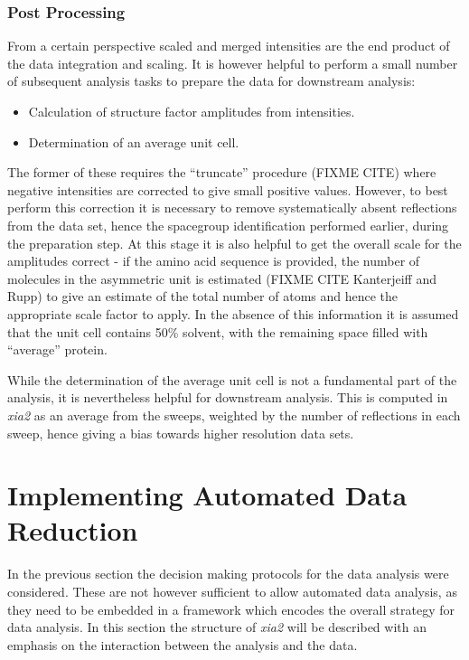 \documentclass[preprint,pdf]{iucr}
\begin{document}
\subsubsection{Post Processing}

From a certain perspective scaled and merged intensities are the end
product of the data integration and scaling. It is however helpful to
perform a small number of subsequent analysis tasks to prepare the
data for downstream analysis:

\begin{itemize}
\item{Calculation of structure factor amplitudes from intensities.}
\item{Determination of an average unit cell.}
\end{itemize}

\noindent
The former of these requires the ``truncate'' procedure (FIXME CITE)
where negative intensities are corrected to give small positive
values. However, to best perform this correction it is necessary to
remove systematically absent reflections from the data set, hence the
spacegroup identification performed earlier, during the preparation
step. At this stage it is also helpful to get the overall scale for
the amplitudes correct - if the amino acid sequence is provided, the
number of molecules in the asymmetric unit is estimated (FIXME CITE
Kanterjeiff and Rupp) to give an estimate of the total number of atoms
and hence the appropriate scale factor to apply. In the absence of
this information it is assumed that the unit cell contains 50\%
solvent, with the remaining space filled with ``average'' protein. 

While the determination of the average unit cell is not a fundamental
part of the analysis, it is nevertheless helpful for downstream
analysis. This is computed in \emph{xia2} as an average from the
sweeps, weighted by the number of reflections in each sweep, hence
giving a bias towards higher resolution data sets.

\section{Implementing Automated Data Reduction}

In the previous section the decision making protocols for the data
analysis were considered. These are not however sufficient to allow
automated data analysis, as they need to be embedded in a framework
which encodes the overall strategy for data analysis. In this section
the structure of \emph{xia2} will be described with an emphasis on the
interaction between the analysis and the data.
\end{document}
